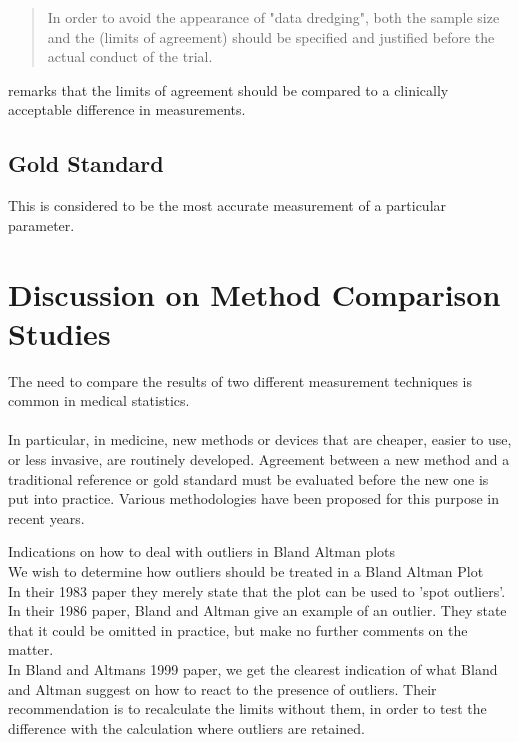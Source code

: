 \documentclass[12pt, a4paper]{report}
\begin{document}
\begin{quote}
In order to avoid the appearance of "data dredging", both the
sample size and the (limits of agreement) should be specified and
justified before the actual conduct of the trial. \citep{lin}
\end{quote}

\citet{Dewitte} remarks that the limits of agreement should be
compared to a clinically acceptable difference in measurements.


\subsection{Gold Standard} This is considered to be the most
accurate measurement of a particular parameter.
\section{Discussion on Method Comparison Studies}

The need to compare the results of two different measurement
techniques is common in medical statistics.
\\
\\
In particular, in medicine, new methods or devices that are
cheaper, easier to use, or less invasive, are routinely developed.
Agreement between a new method and a traditional reference or gold
standard must be evaluated before the new one is put into
practice. Various methodologies have been proposed for this
purpose in recent years.

Indications on how to deal with outliers in Bland Altman plots
\\
We wish to determine how outliers should be treated in a Bland
Altman Plot
\\
In their 1983 paper they merely state that the plot can be used to
'spot outliers'.
\\
In  their 1986 paper, Bland and Altman give an example of an
outlier. They state that it could be omitted in practice, but make
no further comments on the matter.
\\
In Bland and Altmans 1999 paper, we get the clearest indication of
what Bland and Altman suggest on how to react to the presence of
outliers. Their recommendation is to recalculate the limits
without them, in order to test the difference with the calculation
where outliers are retained.\\
\end{document}
